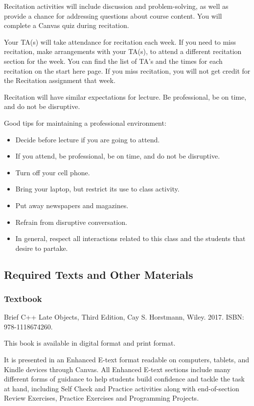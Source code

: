 Recitation activities will include discussion and problem-solving, as well as provide a chance for addressing questions about course content. You will complete a Canvas quiz during recitation. 

Your TA(s) will take attendance for recitation each week. If you need to miss recitation, make arrangements with your TA(s), to attend a different recitation section for the week. You can find the list of TA’s and the times for each recitation on the start here page. If you miss recitation, you will not get credit for the Recitation assignment that week. 

Recitation will have similar expectations for lecture. Be professional, be on time, and do not be disruptive.

Good tips for maintaining a professional environment:

\begin{itemize}
    \item Decide before lecture if you are going to attend.
    \item If you attend, be professional, be on time, and do not be disruptive.
    \item Turn off your cell phone.
    \item Bring your laptop, but restrict its use to class activity.
    \item Put away newspapers and magazines.
    \item Refrain from disruptive conversation.
    \item In general, respect all interactions related to this class and the students that desire to partake.
\end{itemize}

\subsection{Required Texts and Other Materials}

\subsubsection{Textbook}

Brief C++ Late Objects, Third Edition, Cay S. Horstmann, Wiley. 2017. ISBN: 978-1118674260.

This book is available in digital format and print format.

It is presented in an Enhanced E-text format readable on computers, tablets, and Kindle devices through Canvas. All Enhanced E-text sections include many different forms of guidance to help students build confidence and tackle the task at hand, including Self Check and Practice activities along with end-of-section Review Exercises, Practice Exercises and Programming Projects.

